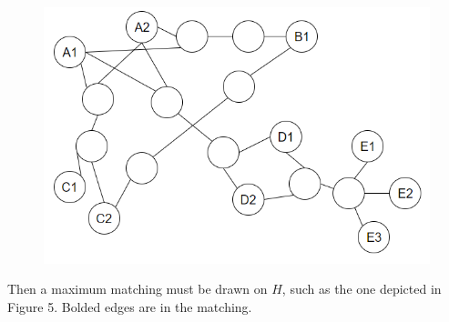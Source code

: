 \documentclass{article}
\begin{document}
	\begin{figure}[h]
		\caption{}
		\includegraphics{Figure4}
	\end{figure}

	Then a maximum matching must be drawn on $H$, such as the one depicted in Figure 5. Bolded edges are in the matching.
	
\end{document}
